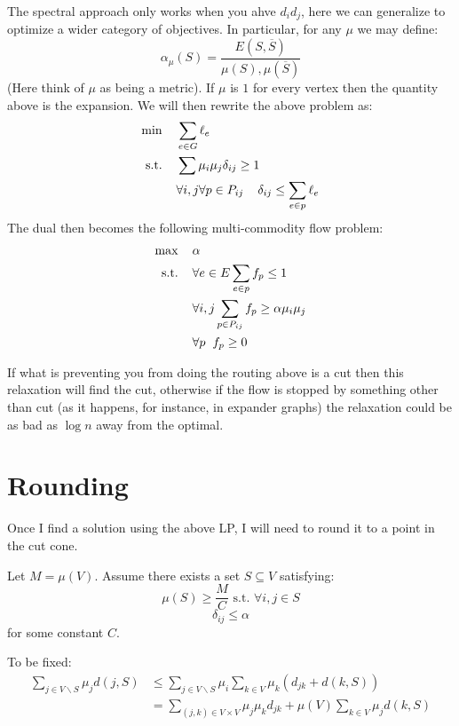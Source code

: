 \documentclass[11pt]{article}
\begin{document}
The spectral approach only works when you ahve $d_id_j$, here we can generalize to optimize a wider category of objectives. In particular, for any $\mu$ we may define:
\[
    \alpha_{\mu}(S) = \frac{E(S,\overline{S})}{\mu(S),\mu(\overline{S})}
\]
(Here think of $\mu$ as being a metric). If $\mu$ is $1$ for every vertex then the quantity above is the expansion.
We will then rewrite the above problem as:
\begin{align*}
    \min \hspace{2mm}& \hspace{2mm}\sum_{e \in G} \ell_e\\
    \text{s.t.}\hspace{2mm}&\hspace{2mm}\sum \mu_i\mu_j\delta_{ij} \geq 1\\
    &\hspace{2mm}\forall i,j \forall p \in P_{ij}\hspace{4mm}\delta_{ij}\leq \sum_{e\in p}\ell_e
\end{align*}
The dual then becomes the following multi-commodity flow problem:
\begin{align*}
    \max \hspace{2mm}& \hspace{2mm}\alpha\\
    \text{s.t.}\hspace{2mm}&\hspace{2mm}\forall e \in E \sum_{e \in p} f_p \leq 1\\
    &\hspace{2mm}\forall i,j \sum_{p \in P_{ij}} f_p \geq \alpha\mu_i\mu_j\\
    &\hspace{2mm}\forall p \hspace{2mm} f_p \geq 0
\end{align*}

If what is preventing you from doing the routing above is a cut then this relaxation will find the cut, otherwise if the flow is stopped by something other than cut (as it happens, for instance, in expander graphs) the relaxation could be as bad as $\log n$ away from the optimal.\\

\section*{Rounding}
Once I find a solution using the above LP, I will need to round it to a point in the cut cone.

\begin{lemma}
Let $M = \mu(V)$. Assume there exists a set $S \subseteq V$ satisfying:
\[
    \mu(S) \geq \frac{M}{C} \text{ s.t. }\forall i,j \in S
\]
\[
    \delta_{ij}\leq \alpha
\]
for some constant $C$.
\end{lemma}

{\color{red} To be fixed:}
\begin{align*}
    \sum_{j \in V\backslash S}\mu_jd(j,S) &\leq \sum_{j \in V \backslash S}\mu_i \sum_{k \in V} \mu_k(d_{jk} + d(k,S))\\
    &= \sum_{(j,k)\in V\times V}  \mu_j\mu_kd_{jk}+\mu(V)\sum_{k \in V} \mu_jd(k,S)
\end{align*}
\end{document}
